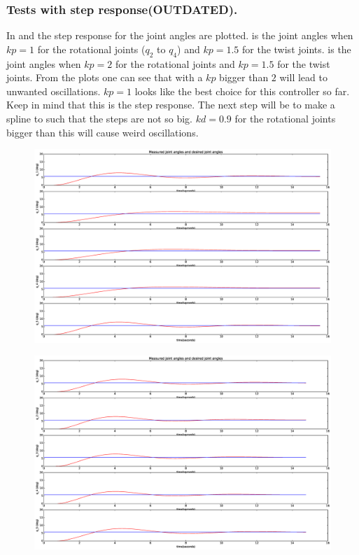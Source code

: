 \subsubsection{Tests with step response(OUTDATED).}
In  and  the step response for the joint angles are plotted.  is the joint angles when $kp = 1$ for the rotational joints ($q_2$ to $q_4$) and $kp = 1.5$ for the twist joints.   is the joint angles when $kp = 2$ for the rotational joints and $kp = 1.5$ for the twist joints. From the plots one can see that with a $kp$ bigger than $2$ will lead to unwanted oscillations. $kp = 1$ looks like the best choice for this controller so far. Keep in mind that this is the step response. The next step will be to make a spline to such that the steps are not so big. $kd = 0.9$ for the rotational joints bigger than this will cause weird oscillations.

\begin{figure}[htbp]
  \centering
  \includegraphics[width=.9\textwidth]{img/joingangKp1.eps}
  \caption{}
  \label{fig:testkp1}
\end{figure}
\begin{figure}[htbp]
  \centering
  \includegraphics[width=.9\textwidth]{img/joingangKp2.eps}
  \caption{}
  \label{fig:testkp2}
\end{figure}

